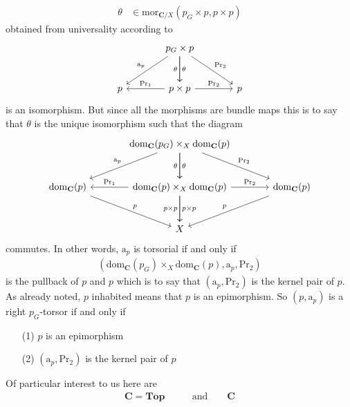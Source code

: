 \begin{exa}
\begin{enumerate}
\begin{align*}
  \theta
  &\in
  \mathrm{mor}_{\mathbf{C} \slash X}
  \left(
    p_{G}
    \times
    p,
    p
    \times
    p
  \right)
\end{align*}
obtained from universality according to
\[
\begin{tikzcd}[sep=large]
  &
  p_{G}
  \times
  p
  \arrow{dr}{\mathrm{Pr}_{2}}
  \arrow{d}{\theta}
  \arrow[swap]{d}{\theta}
  \arrow[swap]{dl}{\mathrm{a}_{p}}
  &
  \\
  p
  &
  p
  \times
  p
  \arrow{r}{\mathrm{Pr}_{2}}
  \arrow[swap]{l}{\mathrm{Pr}_{1}}
  &
  p
\end{tikzcd}
\]
is an isomorphism. But since all the morphisms are bundle maps this is to say that $\theta$ is the unique isomorphism such that the diagram
\[
\begin{tikzcd}[sep=large]
  &
  \mathrm{dom}_{\mathbf{C}}(p_{G})
  \times_{X}
  \mathrm{dom}_{\mathbf{C}}(p)
  \arrow{dr}{\mathrm{Pr}_{2}}
  \arrow{d}{\theta}
  \arrow[swap]{d}{\theta}
  \arrow[swap]{dl}{\mathrm{a}_{p}}
  &
  \\
  \mathrm{dom}_{\mathbf{C}}(p)
  \arrow{dr}{p}
  &
  \mathrm{dom}_{\mathbf{C}}(p)
  \times_{X}
  \mathrm{dom}_{\mathbf{C}}(p)
  \arrow{r}{\mathrm{Pr}_{2}}
  \arrow{d}{p \times p}
  \arrow[swap]{d}{p \times p}
  \arrow[swap]{l}{\mathrm{Pr}_{1}}
  &
  \mathrm{dom}_{\mathbf{C}}(p)
  \arrow[swap]{dl}{p}
  \\
  &
  X
  &
\end{tikzcd}
\]
commutes. In other words, $\mathrm{a}_{p}$ is torsorial if and only if
\begin{align*}
  \left(
    \mathrm{dom}_{\mathbf{C}}(p_{G})
    \times_{X}
    \mathrm{dom}_{\mathbf{C}}(p),
    \mathrm{a}_{p},
    \mathrm{Pr}_{2}
  \right)
\end{align*}
is the pullback of $p$ and $p$ which is to say that $(\mathrm{a}_{p},\mathrm{Pr}_{2})$ is the kernel pair of $p$. As already noted, {\glqq}$p$ inhabited{\grqq} means that {\glqq}$p$ is an epimorphism{\grqq}. So $(p,\mathrm{a}_{p})$ is a right $p_{G}$-torsor if and only if
\begin{enumerate}
\item[(1)]
$p$ is an epimorphism
\item[(2)]
$(\mathrm{a}_{p},\mathrm{Pr}_{2})$ is the kernel pair of $p$
\end{enumerate}
Of particular interest to us here are
\begin{align*}
  \mathbf{C}
  =
  \mathbf{Top}
  \qquad
  &\text{and}
  \qquad
  \mathbf{C}

\end{align*}
\end{enumerate}
\end{exa}
